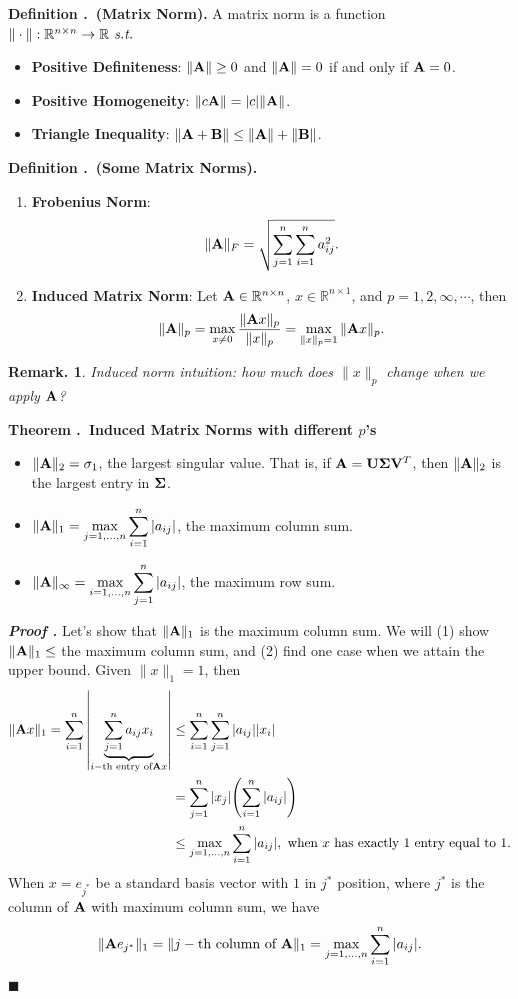 \documentclass[12pt, a4paper]{article}
\newcounter{index}[subsection]
\newenvironment*{df}[1]{\par\noindent\textbf{Definition \thesubsection.\stepcounter{index}\theindex\ (#1).}}{\par}
\newenvironment*{thm}[1]{\begin{tcolorbox}\par\noindent\textbf{Theorem \thesubsection.\stepcounter{index}\theindex\ #1} \par}{\par\end{tcolorbox}}
\newcounter{nprf}[subsection]
\newenvironment*{prf}{\par\indent\textbf{\textit{Proof \stepcounter{nprf}\thenprf.}}}{\hfill$\blacksquare$\par}
\newtheorem{rmk}{Remark.}[section]
\def\R{{\mathbb{R}}}
\def\A{\vb A}
\def\dsst{\displaystyle}
\def\st{\emph{\ s.t.\ }}
\begin{document}
\begin{df}{Matrix Norm}
	A matrix norm is a function $\|\cdot\|:\R^{n\times n}\to\R\st$
	\begin{itemize}
		\item \textbf{Positive Definiteness}: $\|\A\|\geq0$ and $\|\A\|=0$ if and only if $\A=0$.
		\item \textbf{Positive Homogeneity}: $\|c\A\|=\qty|c|\|\A\|$.
		\item \textbf{Triangle Inequality}: $\|\A+\vb{B}\|\leq\|\A\|+\|\vb{B}\|$.
	\end{itemize}	
\end{df}
\begin{df}{Some Matrix Norms}
	\begin{enumerate}
		\item \textbf{Frobenius Norm}: \[\|\A\|_F=\sqrt{\sum_{j=1}^n\sum_{i=1}^na_{ij}^2}.\]
		\item \textbf{Induced Matrix Norm}: Let $\A\in\R^{n\times n}$, $x\in\R^{n\times1}$, and $p=1,2,\infty,\cdots$, then \[\|\A\|_p=\max_{x\neq0}\dfrac{\|\A x\|_p}{\|x\|_p}=\max_{\|x\|_p=1}\|\A x\|_p.\]
	\end{enumerate}	
\end{df}
\begin{rmk}Induced norm intuition: how much does $\|x\|_p$ change when we apply $\A$?\end{rmk}
\begin{thm}{Induced Matrix Norms with different $p$'s}
	\begin{itemize}
		\item $\|\A\|_2=\sigma_1$, the largest singular value. That is, if $\A=\vb U\vb\Sigma\vb V^T$, then $\|\A\|_2$ is the largest entry in $\vb\Sigma$.
		\item $\dsst\|\A\|_1=\max_{j=1,\dots,n}\sum_{i=1}^n\qty|a_{ij}|$, the maximum column sum.
		\item $\dsst\|\A\|_\infty=\max_{i=1,\dots,n}\sum_{j=1}^n\qty|a_{ij}|$, the maximum row sum. 
	\end{itemize}	
\end{thm}
\begin{prf}
	Let's show that $\|\A\|_1$ is the maximum column sum. We will (1) show $\|\A\|_1\leq$ the maximum column sum, and (2) find one case when we attain the upper bound. Given $\|x\|_1=1$, then \begin{align*}\|\A x\|_1=\sum_{i=1}^n\qty|\underbrace{\sum_{j=1}^n a_{ij}x_{i}}_{i-\text{th entry of}\A x}|&\leq\sum_{i=1}^n\sum_{j=1}^n\qty|a_{ij}|\qty|x_i|\\&=\sum_{j=1}^n\qty|x_j|\qty(\sum_{i=1}^n\qty|a_{ij}|)\\&\leq\max_{j=1,\dots,n}\sum_{i=1}^n\qty|a_{ij}|,\text{ when }x\text{ has exactly 1}\text{ entry equal to }1.\end{align*} When $x=e_{j^*}$ be a standard basis vector with $1$ in $j^*$ position, where $j^*$ is the column of $\A$ with maximum column sum, we have \[\|\A e_{j^*}\|_1=\|j-\text{th column of }\A\|_1=\max_{j=1,\dots,n}\sum_{i=1}^n\qty|a_{ij}|.\]	
\end{prf}
\end{document}
